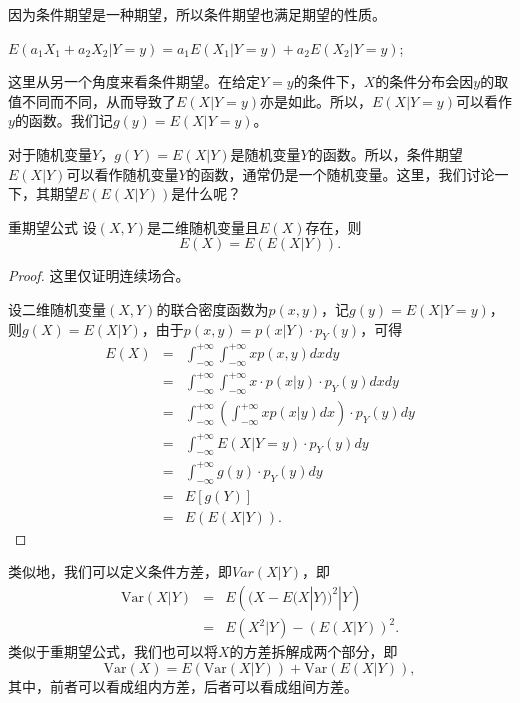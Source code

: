 因为条件期望是一种期望，所以条件期望也满足期望的性质。
\begin{property}
 $E\left(a_{1} X_{1}+a_{2} X_{2}  |  Y=y\right)=a_{1} E\left(X_{1}  |  Y=y\right)+a_{2} E\left(X_{2}  |  Y=y\right)$;
\end{property}
\begin{note}
\vspace{4.5cm}
\end{note}


这里从另一个角度来看条件期望。在给定$Y=y$的条件下，$X$的条件分布会因$y$的取值不同而不同，从而导致了$E(X|Y=y)$亦是如此。所以，$E(X|Y=y)$可以看作$y$的函数。我们记$g(y) = E(X|Y=y)$。

对于随机变量$Y$，$g(Y)= E(X|Y)$是随机变量$Y$的函数。所以，条件期望$E(X|Y)$可以看作随机变量$Y$的函数，通常仍是一个随机变量。这里，我们讨论一下，其期望$E(E(X|Y))$是什么呢？

\begin{theorem}{重期望公式}
设$(X,Y)$是二维随机变量且$E(X)$存在，则$$E(X)=E(E(X |  Y)).$$
\end{theorem}
\begin{proof}
这里仅证明连续场合。

设二维随机变量$(X,Y)$的联合密度函数为$p(x,y)$，记$g(y)=E(X |  Y=y)$，则$g(X)=E(X |  Y)$，由于$p(x,y)=p(x |  Y)\cdot p_{Y}(y)$，可得
\begin{eqnarray*}
E(X) &=&\int_{-\infty}^{+\infty} \int_{-\infty}^{+\infty} x p(x, y) d x d y \\
&=&\int_{-\infty}^{+\infty} \int_{-\infty}^{+\infty} x \cdot p(x  |  y) \cdot p_{Y}(y) d x d y \\
&=&\int_{-\infty}^{+\infty} \left(\int_{-\infty}^{+\infty} x p(x |  y) dx \right) \cdot p_{Y}(y) d y \\
&=&\int_{-\infty}^{+\infty} E(X  |  Y=y) \cdot p_{Y}(y) d y \\
&=&\int_{-\infty}^{+\infty} g(y) \cdot p_{Y}(y) d y \\
&=&E[g(Y)] \\
&=&E(E(X  |  Y)).
\end{eqnarray*}
\end{proof}
类似地，我们可以定义条件方差，即$Var(X|Y)$，即
\begin{eqnarray*}
    \text{Var}(X | Y) &=& E\left ( (X-E(X |  Y))^{2} |  Y \right )\\
    &=&E(X^{2} |  Y)-\left ( E(X |  Y) \right )^{2}.
\end{eqnarray*}
类似于重期望公式，我们也可以将$X$的方差拆解成两个部分，即
$$\text{Var}(X)=E(\text{Var}(X |  Y))+\text{Var}(E(X |  Y)),$$
其中，前者可以看成组内方差，后者可以看成组间方差。

